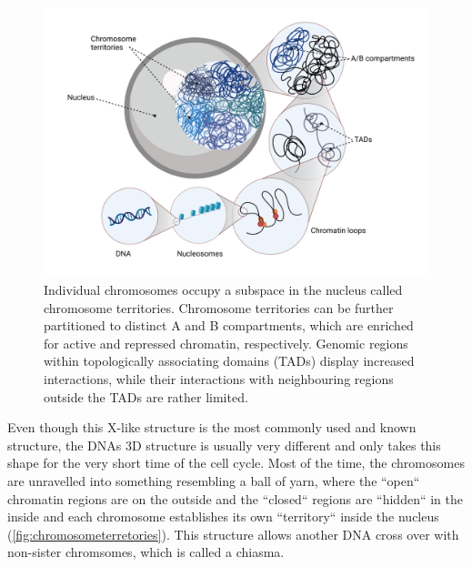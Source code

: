 \begin{figure}[!ht]
\centering
\includegraphics[width=0.9\linewidth]{Figures/intro/ChromosomeTerritories}
\caption[Overview DNA structure]{Individual chromosomes occupy a subspace in the nucleus called chromosome territories. Chromosome territories can be further partitioned to distinct A and B compartments, which are enriched for active and repressed chromatin, respectively. Genomic regions within topologically associating domains (TADs) display increased interactions, while their interactions with neighbouring regions outside the TADs are rather limited.}\label{fig:chromosometerretories}
\end{figure}

Even though this X-like structure is the most commonly used and known structure, the DNAs 3D structure is usually very different and only takes this shape for the very short time of the cell cycle. Most of the time, the chromosomes are unravelled into something resembling a ball of yarn, where the ``open`` chromatin regions are on the outside and the ``closed`` regions are ``hidden`` in the inside and each chromosome establishes its own ``territory`` inside the nucleus (\autoref{fig:chromosometerretories}). This structure allows another DNA cross over with non-sister chromsomes, which is called a chiasma.

